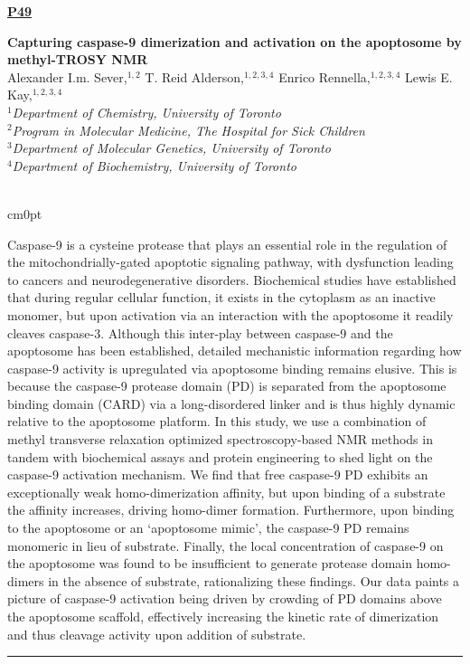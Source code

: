 \documentclass[titlepage,oneside,openany,10pt]{book}
\newenvironment{posterabswfig}[7] %
        {
	\FPeval{\cutw}{clip(16.7-#6)}
	\FPeval{\cutl}{round(#7/0.35+1,3)}
	\begin{flushright}
                \underline{\textbf{#4}}
        \end{flushright}
        \textbf{#1}\\%
        #2\\%
        \textit{#3}\\\\%
        \def\windowpagestuff{\centering
                \texttt{[image: \#5]}
	}
        \opencutright
        \begin{cutout}{0}{\cutw cm}{0pt}{\RoundingUpFunction{\cutl}}
        \noindent
	}
	{
	\end{cutout}
	\noindent\rule{15cm}{0.5pt}%
        }
\begin{document}
\begin{posterabswfig}
    {Capturing caspase-9 dimerization and activation on the apoptosome by methyl-TROSY NMR}
    {Alexander I.m. Sever,$^{1,2}$ T. Reid Alderson,$^{1,2,3,4}$ Enrico Rennella,$^{1,2,3,4}$ Lewis E. Kay,$^{1,2,3,4}$}
    {
    $^1$Department of Chemistry, University of Toronto\\
    $^2$Program in Molecular Medicine, The Hospital for Sick Children\\
    $^3$Department of Molecular Genetics, University of Toronto\\
    $^4$Department of Biochemistry, University of Toronto
    }
    {P49}
    {abstract_figures/Sever_Alexander_Oral.png}
    {8.0}
    {4.0}
    Caspase-9 is a cysteine protease that plays an essential role in the regulation of the mitochondrially-gated apoptotic signaling pathway, with dysfunction leading to cancers and neurodegenerative disorders. Biochemical studies have established that during regular cellular function, it exists in the cytoplasm as an inactive monomer, but upon activation via an interaction with the apoptosome it readily cleaves caspase-3. Although this inter-play between caspase-9 and the apoptosome has been established, detailed mechanistic information regarding how caspase-9 activity is upregulated via apoptosome binding remains elusive. This is because the caspase-9 protease domain (PD) is separated from the apoptosome binding domain (CARD) via a long-disordered linker and is thus highly dynamic relative to the apoptosome platform. In this study, we use a combination of methyl transverse relaxation optimized spectroscopy-based NMR methods in tandem with biochemical assays and protein engineering to shed light on the caspase-9 activation mechanism. We find that free caspase-9 PD exhibits an exceptionally weak homo-dimerization affinity, but upon binding of a substrate the affinity increases, driving homo-dimer formation. Furthermore, upon binding to the apoptosome or an `apoptosome mimic', the caspase-9 PD remains monomeric in lieu of substrate. Finally, the local concentration of caspase-9 on the apoptosome was found to be insufficient to generate protease domain homo-dimers in the absence of substrate, rationalizing these findings. Our data paints a picture of caspase-9 activation being driven by crowding of PD domains above the apoptosome scaffold, effectively increasing the kinetic rate of dimerization and thus cleavage activity upon addition of substrate.
    \label{SeverA}
\end{posterabswfig}
\end{document}
